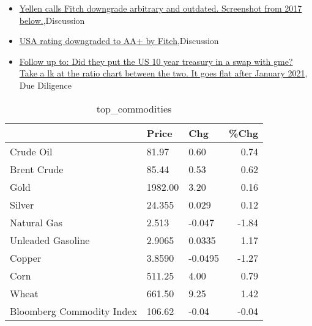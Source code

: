 \documentclass{article}%
\begin{document}
%
\begin{itemize}%
\item%
\href{https://reddit.com/r/StockMarket/comments/15ftat4/yellen\_calls\_fitch\_downgrade\_arbitrary\_and/}{Yellen calls Fitch downgrade arbitrary and outdated. Screenshot from 2017 below.},Discussion%
\item%
\href{https://reddit.com/r/StockMarket/comments/15fpnhl/usa\_rating\_downgraded\_to\_aa\_by\_fitch/}{USA rating downgraded to AA+ by Fitch},Discussion%
\item%
\href{https://reddit.com/r/Superstonk/comments/15fyswq/follow\_up\_to\_did\_they\_put\_the\_us\_10\_year\_treasury/}{Follow up to: Did they put the US 10 year treasury in a swap with gme? Take a lk at the ratio chart between the two. It goes flat after January 2021}, Due Diligence%
\end{itemize}%


\begin{table}[htbp]%
\caption{top\_commodities}%
\centering%
\begin{adjustbox}{width=1\textwidth}%
\begin{tabular}{lllr}
\toprule
                          &   Price &     Chg &  \%Chg \\
\midrule
               Crude Oil  &   81.97 &    0.60 &  0.74 \\
             Brent Crude  &   85.44 &    0.53 &  0.62 \\
                    Gold  & 1982.00 &    3.20 &  0.16 \\
                  Silver  &  24.355 &   0.029 &  0.12 \\
             Natural Gas  &   2.513 &  -0.047 & -1.84 \\
       Unleaded Gasoline  &  2.9065 &  0.0335 &  1.17 \\
                  Copper  &  3.8590 & -0.0495 & -1.27 \\
                    Corn  &  511.25 &    4.00 &  0.79 \\
                   Wheat  &  661.50 &    9.25 &  1.42 \\
Bloomberg Commodity Index &  106.62 &   -0.04 & -0.04 \\
\bottomrule
\end{tabular}
%
\end{adjustbox}%
\end{table}

%
\end{document}
